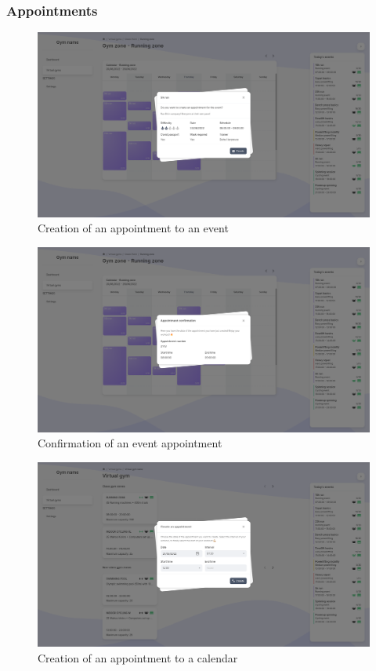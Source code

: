 \documentclass[a4paper, 12pt, oneside]{book}
\begin{document}
\subsubsection{Appointments}
\begin{figure}[H]
	\centering
	\includegraphics[width=\textwidth]{assets/client-screenshots/create-event-appointment.png}
	\caption{Creation of an appointment to an event}
\end{figure}
\begin{figure}[H]
	\centering
	\includegraphics[width=\textwidth]{assets/client-screenshots/event-appointment-created.png}
	\caption{Confirmation of an event appointment}
\end{figure}
\begin{figure}[H]
	\centering
	\includegraphics[width=\textwidth]{assets/client-screenshots/create-calendar-appointment.png}
	\caption{Creation of an appointment to a calendar}
\end{figure}
\end{document}
